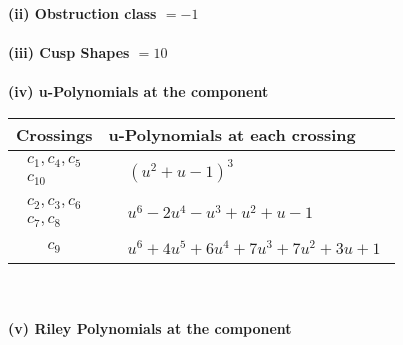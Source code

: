 \documentclass[1p]{elsarticle_modified}
\theoremstyle{definition}
\begin{document}
\flushleft \textbf{(ii) Obstruction class $= -1$}\\~\\
\flushleft \textbf{(iii) Cusp Shapes $= 10$}\\~\\
\newpage\renewcommand{\arraystretch}{1}
\flushleft \textbf{(iv) u-Polynomials at the component}\newline \\
\begin{tabular}{m{50pt}|m{274pt}}
Crossings & \hspace{64pt}u-Polynomials at each crossing \\
\hline $$\begin{aligned}c_{1},c_{4},c_{5}\\c_{10}\end{aligned}$$&$\begin{aligned}
&(u^2+u-1)^3
\end{aligned}$\\
\hline $$\begin{aligned}c_{2},c_{3},c_{6}\\c_{7},c_{8}\end{aligned}$$&$\begin{aligned}
&u^6-2 u^4- u^3+u^2+u-1
\end{aligned}$\\
\hline $$\begin{aligned}c_{9}\end{aligned}$$&$\begin{aligned}
&u^6+4 u^5+6 u^4+7 u^3+7 u^2+3 u+1
\end{aligned}$\\
\hline
\end{tabular}\\~\\
\newpage\renewcommand{\arraystretch}{1}
\flushleft \textbf{(v) Riley Polynomials at the component}\newline \\
\end{document}
